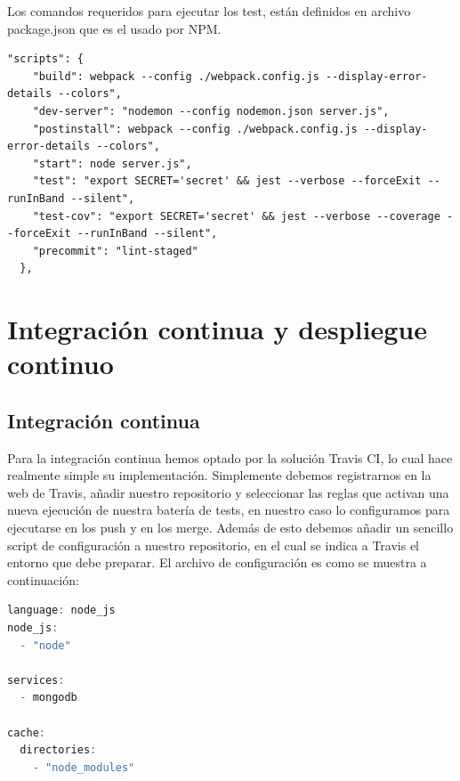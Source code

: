 Los comandos requeridos para ejecutar los test, están definidos en archivo package.json que es el usado por NPM.
\begin{lstlisting}
"scripts": {
    "build": webpack --config ./webpack.config.js --display-error-details --colors",
    "dev-server": "nodemon --config nodemon.json server.js",
    "postinstall": webpack --config ./webpack.config.js --display-error-details --colors",
    "start": node server.js",
    "test": "export SECRET='secret' && jest --verbose --forceExit --runInBand --silent",
    "test-cov": "export SECRET='secret' && jest --verbose --coverage --forceExit --runInBand --silent",
    "precommit": "lint-staged"
  },
\end{lstlisting}

\section {Integración continua y despliegue continuo}
\subsection{Integración continua}
Para la integración continua hemos optado por la solución Travis CI, lo cual hace realmente simple su implementación. Simplemente debemos registrarnos en la web de Travis, añadir nuestro repositorio y seleccionar las reglas que activan una nueva ejecución de nuestra batería de tests, en nuestro caso lo configuramos para ejecutarse en los push y en los merge. Además de esto debemos añadir un sencillo script de configuración a nuestro repositorio, en el cual se indica a Travis el entorno que debe preparar. El archivo de configuración es como se muestra a continuación:
\begin{lstlisting}[language=javascript,caption={Integración continua},label={lst:appjs}]
language: node_js
node_js:
  - "node"

services:
  - mongodb

cache:
  directories:
    - "node_modules"

\end{lstlisting}
